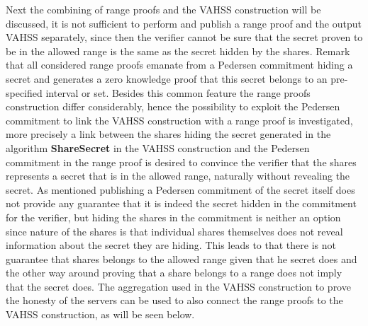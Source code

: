 Next the combining of range proofs and the VAHSS construction will be discussed, it is not sufficient to perform and publish a range proof and the output VAHSS separately, since then the verifier cannot be sure that the secret proven to be in the allowed range is the same as the secret hidden by the shares. Remark that all considered range proofs emanate from a Pedersen commitment hiding a secret and generates a zero knowledge proof that this secret belongs to an pre-specified interval or set. Besides this common feature the range proofs construction differ considerably, hence the possibility to exploit the Pedersen commitment to link the VAHSS construction with a range proof is investigated, more precisely a link between the shares hiding the secret generated in the algorithm \textbf{ShareSecret} in the VAHSS construction and the Pedersen commitment in the range proof is desired to  convince the verifier that the shares represents a secret that is in the allowed range, naturally without revealing the secret. As mentioned publishing a Pedersen commitment of the secret itself does not provide any guarantee that it is indeed the secret hidden in the commitment for the verifier, but hiding the shares in the commitment is neither an option since nature of the shares is that individual shares themselves does not reveal information about the secret they are hiding. This leads to that there is not guarantee that shares belongs to the allowed range given that he secret does and the other way around proving that a share belongs to a range does not imply that the secret does. The aggregation used in the VAHSS construction to prove the honesty of the servers can be used to also connect the range proofs to the VAHSS construction, as will be seen below. 

